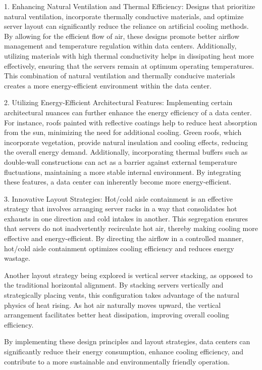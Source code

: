 \documentclass[
  a4paper,  %
  twoside,  %
  bibliography=totoc,
  headsepline,
  cleardoublepage=empty,
  parskip=half,
  draft=false
]{scrbook}
\begin{document}
1. Enhancing Natural Ventilation and Thermal Efficiency:
Designs that prioritize natural ventilation, incorporate thermally conductive materials, and optimize server layout can significantly reduce the reliance on artificial cooling methods. By allowing for the efficient flow of air, these designs promote better airflow management and temperature regulation within data centers. Additionally, utilizing materials with high thermal conductivity helps in dissipating heat more effectively, ensuring that the servers remain at optimum operating temperatures. This combination of natural ventilation and thermally conducive materials creates a more energy-efficient environment within the data center.

2. Utilizing Energy-Efficient Architectural Features:
Implementing certain architectural nuances can further enhance the energy efficiency of a data center. For instance, roofs painted with reflective coatings help to reduce heat absorption from the sun, minimizing the need for additional cooling. Green roofs, which incorporate vegetation, provide natural insulation and cooling effects, reducing the overall energy demand. Additionally, incorporating thermal buffers such as double-wall constructions can act as a barrier against external temperature fluctuations, maintaining a more stable internal environment. By integrating these features, a data center can inherently become more energy-efficient.

3. Innovative Layout Strategies:
Hot/cold aisle containment is an effective strategy that involves arranging server racks in a way that consolidates hot exhausts in one direction and cold intakes in another. This segregation ensures that servers do not inadvertently recirculate hot air, thereby making cooling more effective and energy-efficient. By directing the airflow in a controlled manner, hot/cold aisle containment optimizes cooling efficiency and reduces energy wastage.

Another layout strategy being explored is vertical server stacking, as opposed to the traditional horizontal alignment. By stacking servers vertically and strategically placing vents, this configuration takes advantage of the natural physics of heat rising. As hot air naturally moves upward, the vertical arrangement facilitates better heat dissipation, improving overall cooling efficiency.

By implementing these design principles and layout strategies, data centers can significantly reduce their energy consumption, enhance cooling efficiency, and contribute to a more sustainable and environmentally friendly operation.
\end{document}
